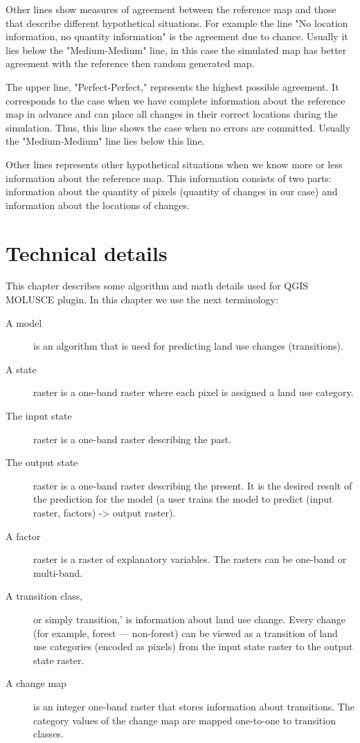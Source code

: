\documentclass{report}
\begin{document}
Other lines show  measures of agreement between the reference map and those that describe different hypothetical situations.
For example the line "No location information, no quantity information"  is the agreement due to chance.
Usually it lies below the "Medium-Medium" line, in this case the simulated map has better agreement with the reference 
then random generated map.

The upper line, "Perfect-Perfect," represents the highest possible agreement.
It corresponds to the case when we have complete information about the reference map in advance 
and can place all changes in their correct locations during the simulation.
Thus, this line shows the case when no errors are committed.
Usually the "Medium-Medium" line lies below this line.

Other lines represents other hypothetical situations when we know more or less information
about the reference map. This information consists of two parts: information about the quantity of pixels (quantity of changes in our case)
and information about the locations of changes.


\chapter{Technical details}
This chapter describes some algorithm and math details used for QGIS MOLUSCE plugin.
In this chapter we use the next terminology:
\begin{description}
\item[A model] is an algorithm that is used for predicting land use changes (transitions).
\item[A state] raster is a one-band raster where each pixel is assigned a land use category.
\item[The input state] raster is a one-band raster describing the past.
\item[The output state] raster is a one-band raster describing the present. It is the desired result of the prediction for the model (a user trains the model to predict (input raster, factors) -> output raster).
\item[A factor] raster is a raster of explanatory variables. The rasters can be one-band or multi-band.
\item[A transition class,] or simply transition,' is information about land use change.
  Every change (for example, forest --- non-forest) can be viewed as a transition of land use categories (encoded as pixels) from the input state raster to the output state raster.
\item[A change map] is an integer one-band raster that stores information about transitions.
  The category values of the change map are mapped one-to-one to transition classes.
\end{description}
\end{document}
